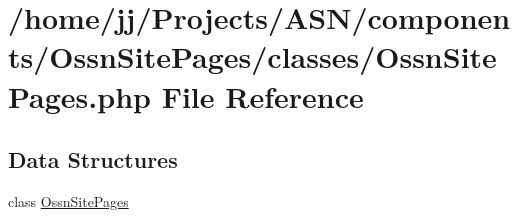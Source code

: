 \hypertarget{_ossn_site_pages_8php}{}\section{/home/jj/\+Projects/\+A\+S\+N/components/\+Ossn\+Site\+Pages/classes/\+Ossn\+Site\+Pages.php File Reference}
\label{_ossn_site_pages_8php}
\subsection*{Data Structures}
\begin{DoxyCompactItemize}
\item 
class \hyperlink{class_ossn_site_pages}{Ossn\+Site\+Pages}
\end{DoxyCompactItemize}
